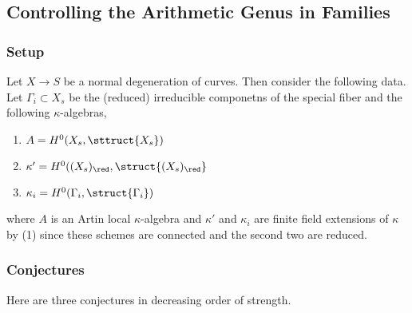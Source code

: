 \documentclass[12pt]{article}
\begin{document}
\subsection{Controlling the Arithmetic Genus in Families}

\subsubsection{Setup}

Let $X \to S$ be a normal degeneration of curves. Then consider the following data. Let $\Gamma_i \subset X_s$ be the (reduced) irreducible componetns of the special fiber and the following $\kappa$-algebras,
\begin{enumerate}
\item $A = H^0(X_s, \sttruct{X_s})$

\item $\kappa' = H^0((X_s)_\red, \struct{(X_s)_\red}$

\item $\kappa_i = H^0(\Gamma_i, \struct{\Gamma_i})$
\end{enumerate}
where $A$ is an Artin local $\kappa$-algebra and $\kappa'$ and $\kappa_i$ are finite field extensions of $\kappa$ by  (1) since these schemes are connected and the second two are reduced.  

\subsubsection{Conjectures}

Here are three conjectures in decreasing order of strength. 
\end{document}
